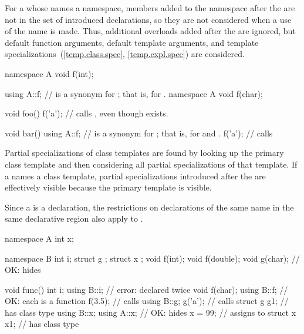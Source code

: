 \pnum
\begin{note}
For a 
whose  names a namespace,
members added to the namespace after the 
are not in the set of introduced declarations, so they are not
considered when a use of the name is made. Thus, additional
overloads added after the  are ignored, but
default function arguments, default template
arguments, and template specializations~(\ref{temp.class.spec},
\ref{temp.expl.spec}) are considered.
\end{note}
\begin{example}
\begin{codeblock}
namespace A {
  void f(int);
}

using A::f;         //  is a synonym for ; that is, for .
namespace A {
  void f(char);
}

void foo() {
  f('a');           // calls , even though  exists.
}

void bar() {
  using A::f;       //  is a synonym for ; that is, for  and .
  f('a');           // calls 
}
\end{codeblock}
\end{example}

\pnum
\begin{note}
Partial specializations of class templates are found by looking up the
primary class template and then considering all partial specializations
of that template. If a  names a class
template, partial specializations introduced after the
 are effectively visible because the primary
template is visible.
\end{note}

\pnum
Since a  is a declaration, the restrictions
on declarations of the same name in the same declarative
region also apply to .
\begin{example}
\begin{codeblock}
namespace A {
  int x;
}

namespace B {
  int i;
  struct g { };
  struct x { };
  void f(int);
  void f(double);
  void g(char);     // OK: hides 
}

void func() {
  int i;
  using B::i;       // error:  declared twice
  void f(char);
  using B::f;       // OK: each  is a function
  f(3.5);           // calls 
  using B::g;
  g('a');           // calls 
  struct g g1;      //  has class type 
  using B::x;
  using A::x;       // OK: hides 
  x = 99;           // assigns to 
  struct x x1;      //  has class type 
}
\end{codeblock}
\end{example}

